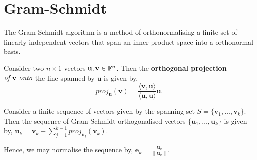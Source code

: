 \section{Gram-Schmidt} %
\label{sec:gram-schmidt}

The Gram-Schmidt algorithm is a method of orthonormalising
a finite set of linearly independent vectors that span an
inner product space into a orthonormal basis.

\begin{defn}
	Consider two $n \times 1$ vectors $\mathbf{u},\mathbf{v} \in \mathbb{F}^n$.
	Then the \textbf{orthogonal projection}
	$\emph{of } \mathbf{v} \emph{ onto}$ the line spanned by $\mathbf{u}$
	is given by,
	\[
		proj_{\mathbf{u}} (\mathbf{v})
		= \frac{\langle \mathbf{v},\mathbf{u} \rangle}
		{\langle \mathbf{u}, \mathbf{u} \rangle} \mathbf{u}.
	\]
\end{defn}

Consider a finite sequence of vectors given by the spanning set
$S = \{ \mathbf{v}_1 , \dots , \mathbf{v}_k \}$. Then the
sequence of Gram-Schmidt orthogonalised vectors
$\{\mathbf{u}_1, \dots , \mathbf{u}_k \}$ is given by,
$\mathbf{u}_k = \mathbf{v}_k - \sum_{j=1}^{k-1} proj_{\mathbf{u}_k} (\mathbf{v}_k)$.

Hence, we may normalise the sequence by, $\mathbf{e}_k = \frac{\mathbf{u}_k}{\| \mathbf{u}_k \|}$.
